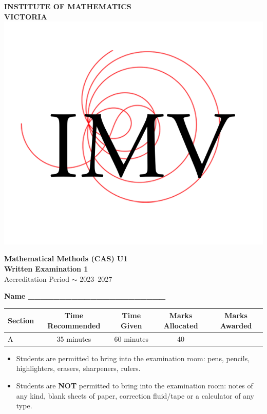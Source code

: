 \documentclass[a4paper,12pt]{article}
\begin{document}
\begin{center}
    \vspace{0.2cm}
    
    \Huge \textbf{INSTITUTE OF MATHEMATICS \\ VICTORIA} \\
    \vspace{0.2cm}
    \includegraphics[width=0.2\linewidth]{IMV yt.png}
    \vspace{0.2cm}
    
    \LARGE \textbf{Mathematical Methods (CAS) U1} \\
    \vspace{0.2cm}
    \LARGE \textbf{Written Examination 1} \\
    \vspace{0.2cm}
    \Large Accreditation Period $\sim$ 2023--2027 \\
    \vspace{1cm}
    
    \normalsize \textbf{Name \_\_\_\_\_\_\_\_\_\_\_\_\_\_\_\_\_\_\_\_\_\_} \\
    \vspace{1cm}
    
    \begin{tabular}{|l|c|c|c|c|}
        \hline
        \textbf{Section} & \textbf{Time Recommended} & \textbf{Time Given} & \textbf{Marks Allocated} & \textbf{Marks Awarded} \\
        \hline
        A & 35 minutes & 60 minutes & 40 & \\
        \hline
    \end{tabular}
    
    \vspace{1cm}
    
    \begin{minipage}{0.9\textwidth}
    \begin{itemize}
        \item Students are permitted to bring into the examination room: pens, pencils, highlighters, erasers, sharpeners, rulers.
        \item Students are \textbf{NOT} permitted to bring into the examination room: notes of any kind, blank sheets of paper, correction fluid/tape or a calculator of any type.
    \end{itemize}
    \end{minipage}
    

\end{center}
\end{document}

